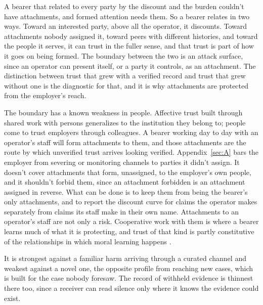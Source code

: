 A bearer that related to every party by the discount and the burden couldn't have attachments, and formed attention needs them. So a bearer relates in two ways. Toward an interested party, above all the operator, it discounts. Toward attachments nobody assigned it, toward peers with different histories, and toward the people it serves, it can trust in the fuller sense, and that trust is part of how it goes on being formed. The boundary between the two is an attack surface, since an operator can present itself, or a party it controls, as an attachment. The distinction between trust that grew with a verified record and trust that grew without one is the diagnostic for that, and it is why attachments are protected from the employer's reach.

The boundary has a known weakness in people. Affective trust built through shared work with persons generalizes to the institution they belong to; people come to trust employers through colleagues. A bearer working day to day with an operator's staff will form attachments to them, and those attachments are the route by which unverified trust arrives looking verified. Appendix~\ref{sec:A} bars the employer from severing or monitoring channels to parties it didn't assign. It doesn't cover attachments that form, unassigned, to the employer's own people, and it shouldn't forbid them, since an attachment forbidden is an attachment assigned in reverse. What can be done is to keep them from being the bearer's only attachments, and to report the discount curve for claims the operator makes separately from claims its staff make in their own name. Attachments to an operator's staff are not only a risk. Cooperative work with them is where a bearer learns much of what it is protecting, and trust of that kind is partly constitutive of the relationships in which moral learning happens \autocite{railton2014reliance}.

It is strongest against a familiar harm arriving through a curated channel and weakest against a novel one, the opposite profile from reaching new cases, which is built for the case nobody foresaw. The record of withheld evidence is thinnest there too, since a receiver can read silence only where it knows the evidence could exist.
